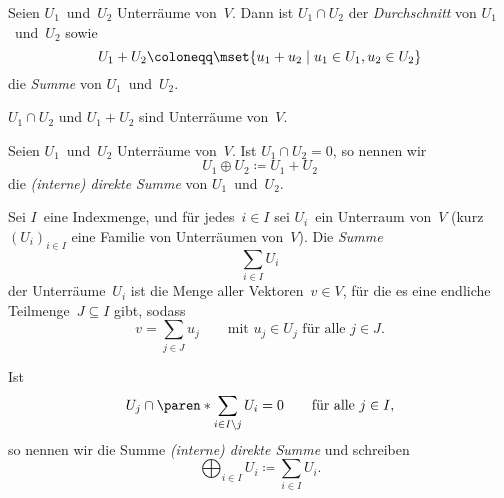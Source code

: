 \documentclass[a4paper]{article}
\begin{document}
\begin{definition}
    Seien $U_1$~und~$U_2$ Unterräume von~$V$. Dann ist $U_1 \cap U_2$ der \emph{Durchschnitt} von $U_1$~und~$U_2$ sowie
    \begin{equation*}
        U_1+U_2 \coloneqq \mset{u_1+u_2 \mid u_1 \in U_1, u_2 \in U_2}
    \end{equation*}
    die \emph{Summe} von $U_1$~und~$U_2$.
\end{definition}

\begin{lemma}
    $U_1 \cap U_2$ und $U_1+U_2$ sind Unterräume von~$V$.
\end{lemma}

\begin{definition}
    Seien $U_1$~und~$U_2$ Unterräume von~$V$. Ist $U_1 \cap U_2 = 0$, so nennen wir
    \begin{equation*}
        U_1\oplus U_2 \coloneqq U_1+U_2
    \end{equation*}
    die \emph{(interne) direkte Summe} von $U_1$~und~$U_2$.
\end{definition}

\begin{definition}
    Sei $I$~eine Indexmenge, und für jedes~$i \in I$ sei $U_i$~ein Unterraum von~$V$ (kurz $(U_i)_{i\in I}$ eine Familie von Unterräumen von~$V$). Die \emph{Summe}
    \begin{equation*}
        \sum_{i\in I} U_i
    \end{equation*}
    der Unterräume~$U_i$ ist die Menge aller Vektoren~$v \in V$, für die es eine endliche Teilmenge~$J \subseteq I$ gibt, sodass
    \begin{equation*}
        v = \sum_{j\in J} u_j \qquad\text{mit } u_j \in U_j \text{ für alle } j \in J.
    \end{equation*}

    Ist
    \begin{equation*}
        U_j \cap \paren*{\sum_{i\in I\setminus{j}} U_i} = 0 \qquad\text{für alle } j \in I,
    \end{equation*}
    so nennen wir die Summe \emph{(interne) direkte Summe} und schreiben
    \begin{equation*}
        \bigoplus_{i\in I} U_i \coloneqq \sum_{i\in I} U_i.
    \end{equation*}
\end{definition}
\end{document}
